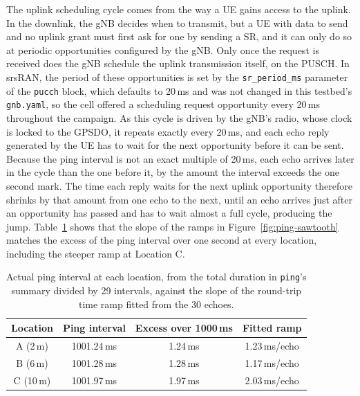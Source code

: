 The uplink scheduling cycle comes from the way a \gls{UE} gains access to the uplink. In the downlink, the \gls{gNB} decides when to transmit, but a \gls{UE} with data to send and no uplink grant must first ask for one by sending a \gls{SR}, and it can only do so at periodic opportunities configured by the \gls{gNB}. Only once the request is received does the \gls{gNB} schedule the uplink transmission itself, on the \gls{PUSCH}. In srsRAN, the period of these opportunities is set by the \texttt{sr\_period\_ms} parameter of the \texttt{pucch} block, which defaults to 20\,ms and was not changed in this testbed's \texttt{gnb.yaml}, so the cell offered a scheduling request opportunity every 20\,ms throughout the campaign. As this cycle is driven by the \gls{gNB}'s radio, whose clock is locked to the \gls{GPSDO}, it repeats exactly every 20\,ms, and each echo reply generated by the \gls{UE} has to wait for the next opportunity before it can be sent. Because the ping interval is not an exact multiple of 20\,ms, each echo arrives later in the cycle than the one before it, by the amount the interval exceeds the one second mark. The time each reply waits for the next uplink opportunity therefore shrinks by that amount from one echo to the next, until an echo arrives just after an opportunity has passed and has to wait almost a full cycle, producing the jump. Table~\ref{tab:ping-drift} shows that the slope of the ramps in Figure~\ref{fig:ping-sawtooth} matches the excess of the ping interval over one second at every location, including the steeper ramp at Location C.

\begin{table}[htbp]
    \centering
    \begin{tabular}{|c|c|c|c|}
        \hline
        \textbf{Location} & \textbf{Ping interval} & \textbf{Excess over 1000\,ms} & \textbf{Fitted ramp} \\
        \hline
        A (2\,m) & 1001.24\,ms & 1.24\,ms & 1.23\,ms/echo \\
        \hline
        B (6\,m) & 1001.28\,ms & 1.28\,ms & 1.17\,ms/echo \\
        \hline
        C (10\,m) & 1001.97\,ms & 1.97\,ms & 2.03\,ms/echo \\
        \hline
    \end{tabular}
    \caption[Ping interval against the fitted round-trip time ramp.]{Actual ping interval at each location, from the total duration in \texttt{ping}'s summary divided by 29 intervals, against the slope of the round-trip time ramp fitted from the 30 echoes.}
    \label{tab:ping-drift}
\end{table}

